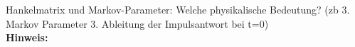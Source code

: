 \begin{question}[section=7,name={Hankelmatrix},difficulty=,type=mdl,tags={}]
	Hankelmatrix und Markov-Parameter: Welche physikalische Bedeutung? (zb 3. Markov Parameter 3. Ableitung der Impulsantwort bei t=0)
	\\ \textbf{Hinweis:}\\
	
\end{question}
\begin{solution}
	
\end{solution}